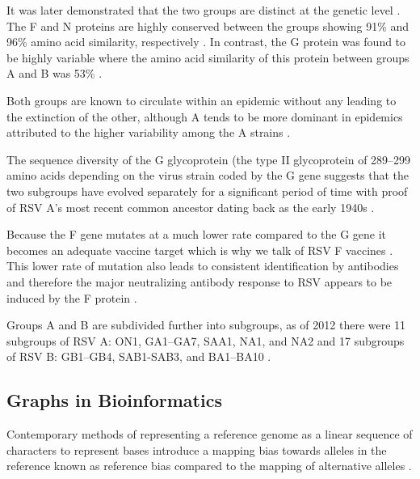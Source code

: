 \documentclass[10pt, a4paper]{article}
\begin{document}
It was later demonstrated that the two groups are distinct at the genetic level
\cite{johnsonFusionGlycoproteinsHuman1988}.
The F and N proteins are highly conserved
between the groups showing 91\% and 96\% amino acid similarity, respectively 
\cite{johnsonFusionGlycoproteinsHuman1988,johnson1BNS21C1989}.
In contrast, the G protein was found to be highly variable where the amino acid
similarity of this protein between groups A and B was 53\%
\cite{johnsonGlycoproteinHumanRespiratory1987,zlatevaMolecularEvolutionCirculation2004}.

Both groups are known to circulate within an epidemic \cite{peretCirculationPatternsGenetically1998}
without any leading to the extinction of the other, although A tends to be more
dominant in epidemics attributed to the higher variability among the A strains
\cite{peretCirculationPatternsGenetically1998,zlatevaGeneticVariabilityMolecular2005}.

The sequence diversity of the G glycoprotein (the type II glycoprotein of
289–299 amino acids depending on the virus strain
\cite{caneMolecularEpidemiologyRespiratory2001}  coded by the 
G gene suggests that the two subgroups have evolved separately for a significant
period of time with proof of RSV A’s most recent common ancestor dating back as
the early 1940s \cite{zlatevaMolecularEvolutionCirculation2004}.

Because the F gene mutates at a much lower rate compared to the G gene it
becomes an adequate vaccine target which is why we talk of RSV F vaccines 
\cite{andersonStrategicPrioritiesRespiratory2013,giersingReportWorldHealth2016}. 
This lower rate of mutation also leads to consistent identification by
antibodies and therefore the major neutralizing antibody response to RSV appears
to be induced by the F protein \cite{olmstedExpressionGlycoproteinRespiratory1986}.

Groups A and B are subdivided further into subgroups, as of 2012 there were 11
subgroups of RSV A: ON1, GA1–GA7, SAA1, NA1, and NA2 and 17 subgroups of RSV
B: GB1–GB4, SAB1-SAB3, and BA1–BA10
\cite{peretCirculationPatternsGenetically1998,peretCirculationPatternsGroup2000,venterGeneticDiversityMolecular2001,trentoMajorChangesProtein2003,shobugawaEmergingGenotypesHuman2009,eshaghiGeneticVariabilityHuman2012,aamirMolecularCharacterizationCirculating2013}.
\subsection{Graphs in Bioinformatics}
\label{sec:org8141293}
Contemporary methods of representing a reference genome as a linear sequence of 
characters to represent bases \cite{diltheyImprovedGenomeInference2015} introduce a
mapping bias towards alleles in the reference known as reference bias compared
to the mapping of alternative alleles
\cite{degnerEffectReadmappingBiases2009,brandtMappingBiasOverestimates2015}. 
\end{document}
